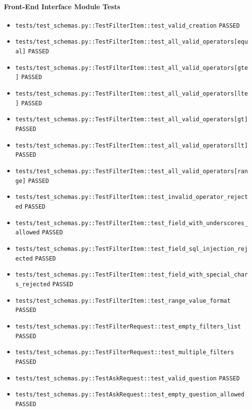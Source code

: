 \documentclass[12pt, titlepage]{article}
\begin{document}
\paragraph{Front-End Interface Module Tests}
{\small
\begin{itemize}[leftmargin=1.5em, itemsep=0.2em, topsep=0.3em]
  \item \nolinkurl{tests/test_schemas.py::TestFilterItem::test_valid_creation} \texttt{PASSED}
  \item \nolinkurl{tests/test_schemas.py::TestFilterItem::test_all_valid_operators[equal]} \texttt{PASSED}
  \item \nolinkurl{tests/test_schemas.py::TestFilterItem::test_all_valid_operators[gte]} \texttt{PASSED}
  \item \nolinkurl{tests/test_schemas.py::TestFilterItem::test_all_valid_operators[lte]} \texttt{PASSED}
  \item \nolinkurl{tests/test_schemas.py::TestFilterItem::test_all_valid_operators[gt]} \texttt{PASSED}
  \item \nolinkurl{tests/test_schemas.py::TestFilterItem::test_all_valid_operators[lt]} \texttt{PASSED}
  \item \nolinkurl{tests/test_schemas.py::TestFilterItem::test_all_valid_operators[range]} \texttt{PASSED}
  \item \nolinkurl{tests/test_schemas.py::TestFilterItem::test_invalid_operator_rejected} \texttt{PASSED}
  \item \nolinkurl{tests/test_schemas.py::TestFilterItem::test_field_with_underscores_allowed} \texttt{PASSED}
  \item \nolinkurl{tests/test_schemas.py::TestFilterItem::test_field_sql_injection_rejected} \texttt{PASSED}
  \item \nolinkurl{tests/test_schemas.py::TestFilterItem::test_field_with_special_chars_rejected} \texttt{PASSED}
  \item \nolinkurl{tests/test_schemas.py::TestFilterItem::test_range_value_format} \texttt{PASSED}
  \item \nolinkurl{tests/test_schemas.py::TestFilterRequest::test_empty_filters_list} \texttt{PASSED}
  \item \nolinkurl{tests/test_schemas.py::TestFilterRequest::test_multiple_filters} \texttt{PASSED}
  \item \nolinkurl{tests/test_schemas.py::TestAskRequest::test_valid_question} \texttt{PASSED}
  \item \nolinkurl{tests/test_schemas.py::TestAskRequest::test_empty_question_allowed} \texttt{PASSED}

\end{itemize}}
\end{document}
